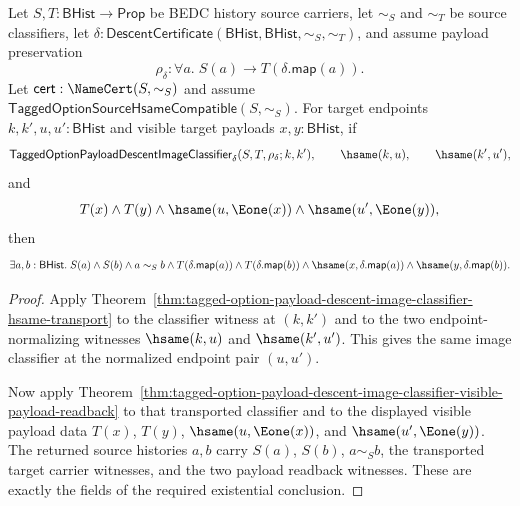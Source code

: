 \begin{theorem}
\label{thm:tagged-option-payload-descent-image-classifier-transported-visible-payload-readback}
Let $S,T:\mathsf{BHist}\to\mathsf{Prop}$ be BEDC history source carriers, let
$\sim_S$ and $\sim_T$ be source classifiers, let
$\delta:\mathsf{DescentCertificate}(\mathsf{BHist},\mathsf{BHist},\sim_S,\sim_T)$,
and assume payload preservation
$$
\rho_{\delta}:\forall a.\;S(a)\to T(\delta.\mathsf{map}(a)).
$$
Let $\mathsf{cert}:\NameCert(S,\sim_S)$ and assume
$\mathsf{TaggedOptionSourceHsameCompatible}(S,\sim_S)$. For target endpoints
$k,k',u,u':\mathsf{BHist}$ and visible target payloads $x,y:\mathsf{BHist}$, if
$$
\mathsf{TaggedOptionPayloadDescentImageClassifier}_{\delta}
(S,T,\rho_{\delta};k,k'),
\qquad
\hsame(k,u),
\qquad
\hsame(k',u'),
$$
and
$$
T(x)\land T(y)\land
\hsame(u,\Eone(x))\land
\hsame(u',\Eone(y)),
$$
then
$$
\exists a,b:\mathsf{BHist}.\;
S(a)\land S(b)\land a\sim_S b\land
T(\delta.\mathsf{map}(a))\land T(\delta.\mathsf{map}(b))\land
\hsame(x,\delta.\mathsf{map}(a))\land
\hsame(y,\delta.\mathsf{map}(b)).
$$
\end{theorem}
\begin{proof}
Apply
Theorem~\ref{thm:tagged-option-payload-descent-image-classifier-hsame-transport}
to the classifier witness at $(k,k')$ and to the two endpoint-normalizing
witnesses $\hsame(k,u)$ and $\hsame(k',u')$. This gives the same image
classifier at the normalized endpoint pair $(u,u')$.

Now apply
Theorem~\ref{thm:tagged-option-payload-descent-image-classifier-visible-payload-readback}
to that transported classifier and to the displayed visible payload data
$T(x)$, $T(y)$, $\hsame(u,\Eone(x))$, and $\hsame(u',\Eone(y))$. The returned
source histories $a,b$ carry $S(a)$, $S(b)$, $a\sim_S b$, the transported target
carrier witnesses, and the two payload readback witnesses. These are exactly the
fields of the required existential conclusion.
\end{proof}

